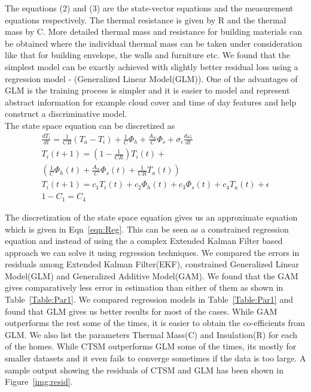   
 \indent The equations (2) and (3) are the state-vector equations and the measurement equations respectively. The thermal resistance is given by R and the thermal mass by C. More detailed thermal mass and resistance for building materials can be obtained where the individual thermal mass can be taken under consideration like that for building envelope, the walls and furniture etc. We found that the simplest model can be exactly achieved with slightly better residual loss using a regression model - (Generalized Linear Model(GLM)). One of the advantages of GLM is the training process is simpler and it is easier to model and represent abstract information for example cloud cover and time of day features and help construct a discriminative model. \\
 \indent The state space equation can be discretized as \begin{eqnarray}
 \frac{dT_i}{dt} = \frac{1}{CR} (T_a-T_i) + \frac{1}{C}\Phi_h + \frac{A_w}{C} \Phi_s + \sigma_i \frac{d\omega_i}{dt} \\
  T_i(t+1)  = (1 - \frac{1}{CR}) T_i(t)+\nonumber \\  (\frac{1}{C}\Phi_h(t) + \frac{A_w}{C} \Phi_s(t) + \frac{1}{CR}T_a(t))\\
   T_i(t+1)  = c_1 T_i(t)+   c_2\Phi_h(t) + c_3\Phi_s(t) + c_4T_a(t) + \epsilon \nonumber \\
   1 - C_1 = C_4 \label{eqn:Reg}
\end{eqnarray}  
  
  
 \indent The discretization of the state space equation gives us an approximate equation which is given in Eqn~\ref{eqn:Reg}.  This can be seen as a constrained regression equation and instead of using the a complex Extended Kalman Filter based approach we can solve it using regression techniques.  We compared the errors in residuals among Extended Kalman Filter(EKF), constrained Generalized Linear Model(GLM) and Generalized Additive Model(GAM). We found that the GAM gives comparatively less error in estimation than either of them as shown in Table~\ref{Table:Par1}. We compared regression models in Table~\ref{Table:Par1} and found that GLM gives us better results for most of the cases. While GAM outperforms the rest some of the times, it is easier to obtain the co-efficients from GLM. We also list the parameters Thermal Mass(C) and Insulation(R) for each of the homes. While CTSM outperforms GLM some of the times, its mostly for smaller datasets and it even fails to converge sometimes if the data is too large.  A sample output showing the residuals of CTSM and GLM has been shown in Figure~\ref{img:resid}. 
 
